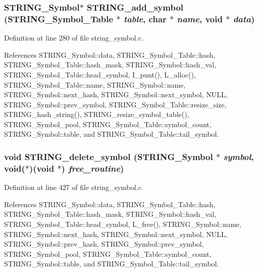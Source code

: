\subsubsection{\setlength{\rightskip}{0pt plus 5cm}\bf{STRING\_\-Symbol}$\ast$ STRING\_\-add\_\-symbol (\bf{STRING\_\-Symbol\_\-Table} $\ast$ {\em table}, char $\ast$ {\em name}, void $\ast$ {\em data})}\label{string__symbol_8h_3a03bfbed0ac7378507b799366f99c83}




Definition at line 280 of file string\_\-symbol.c.

References STRING\_\-Symbol::data, STRING\_\-Symbol\_\-Table::hash, STRING\_\-Symbol\_\-Table::hash\_\-mask, STRING\_\-Symbol::hash\_\-val, STRING\_\-Symbol\_\-Table::head\_\-symbol, I\_\-punt(), L\_\-alloc(), STRING\_\-Symbol\_\-Table::name, STRING\_\-Symbol::name, STRING\_\-Symbol::next\_\-hash, STRING\_\-Symbol::next\_\-symbol, NULL, STRING\_\-Symbol::prev\_\-symbol, STRING\_\-Symbol\_\-Table::resize\_\-size, STRING\_\-hash\_\-string(), STRING\_\-resize\_\-symbol\_\-table(), STRING\_\-Symbol\_\-pool, STRING\_\-Symbol\_\-Table::symbol\_\-count, STRING\_\-Symbol::table, and STRING\_\-Symbol\_\-Table::tail\_\-symbol.
\subsubsection{\setlength{\rightskip}{0pt plus 5cm}void STRING\_\-delete\_\-symbol (\bf{STRING\_\-Symbol} $\ast$ {\em symbol}, void($\ast$)(void $\ast$) {\em free\_\-routine})}\label{string__symbol_8h_9830714aecfd211f9b8885229dadaf6a}




Definition at line 427 of file string\_\-symbol.c.

References STRING\_\-Symbol::data, STRING\_\-Symbol\_\-Table::hash, STRING\_\-Symbol\_\-Table::hash\_\-mask, STRING\_\-Symbol::hash\_\-val, STRING\_\-Symbol\_\-Table::head\_\-symbol, L\_\-free(), STRING\_\-Symbol::name, STRING\_\-Symbol::next\_\-hash, STRING\_\-Symbol::next\_\-symbol, NULL, STRING\_\-Symbol::prev\_\-hash, STRING\_\-Symbol::prev\_\-symbol, STRING\_\-Symbol\_\-pool, STRING\_\-Symbol\_\-Table::symbol\_\-count, STRING\_\-Symbol::table, and STRING\_\-Symbol\_\-Table::tail\_\-symbol.
